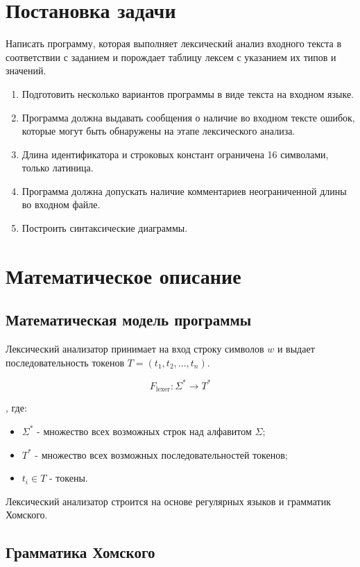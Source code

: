 \documentclass[areasetadvanced]{scrartcl}
\begin{document}
\newpage
\section{Постановка задачи}

Написать программу, которая выполняет лексический анализ входного текста в
соответствии с заданием и порождает таблицу лексем с указанием их типов и значений.
\begin{enumerate}
    \item Подготовить несколько вариантов программы в виде текста на входном языке.
    \item Программа должна выдавать сообщения о наличие во входном тексте ошибок, которые могут быть обнаружены на этапе лексического анализа.
    \item Длина идентификатора и строковых констант ограничена 16 символами, только латиница. 
    \item Программа должна допускать наличие комментариев неограниченной длины во входном файле. 
    \item Построить синтаксические диаграммы.
\end{enumerate}
\newpage

\section{Математическое описание}

\subsection{Математическая модель программы}

Лексический анализатор принимает на вход строку символов \( w \) и выдает последовательность токенов \( T = (t_1, t_2, \dots , t_n) \).

\[
F_{\text{lexer}} : \Sigma^* \rightarrow T^*
\]

, где:
\begin{itemize}
    \item \( \Sigma^* \) - множество всех возможных строк над алфавитом \( \Sigma \);
    \item \( T^* \) - множество всех возможных последовательностей токенов;
    \item \( t_i \in T \) - токены.
\end{itemize}

Лексический анализатор строится на основе регулярных языков и грамматик Хомского.

\subsection{Грамматика Хомского}
\end{document}
